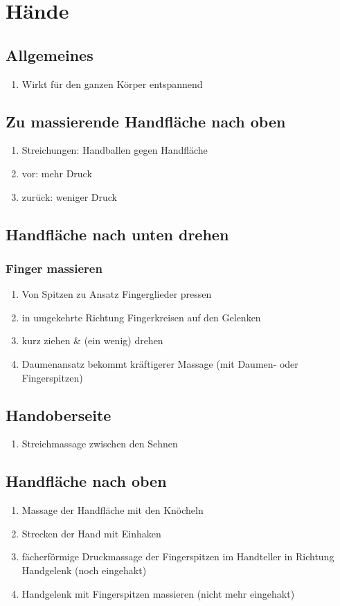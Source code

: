 \section{Hände}

\subsection{Allgemeines}
\begin{enumerate}
\item Wirkt für den ganzen Körper entspannend
\end{enumerate}

\subsection{Zu massierende Handfläche nach oben}
\begin{enumerate}
\item Streichungen: Handballen gegen Handfläche
\item vor: mehr Druck
\item zurück: weniger Druck
\end{enumerate}

\subsection{Handfläche nach unten drehen}

\subsubsection{Finger massieren}
\begin{enumerate}
\item Von Spitzen zu Ansatz Fingerglieder pressen
\item in umgekehrte Richtung Fingerkreisen auf den Gelenken
\item kurz ziehen \& (ein wenig) drehen
\item Daumenansatz bekommt kräftigerer Massage (mit Daumen- oder Fingerspitzen)
\end{enumerate}
\subsection{Handoberseite}
\begin{enumerate}
\item Streichmassage zwischen den Sehnen
\end{enumerate}
\subsection{Handfläche nach oben}
\begin{enumerate}
\item Massage der Handfläche mit den Knöcheln
\item Strecken der Hand mit Einhaken
\item fächerförmige Druckmassage der Fingerspitzen im Handteller in Richtung Handgelenk (noch eingehakt)
\item Handgelenk mit Fingerspitzen massieren (nicht mehr eingehakt)
\end{enumerate}


